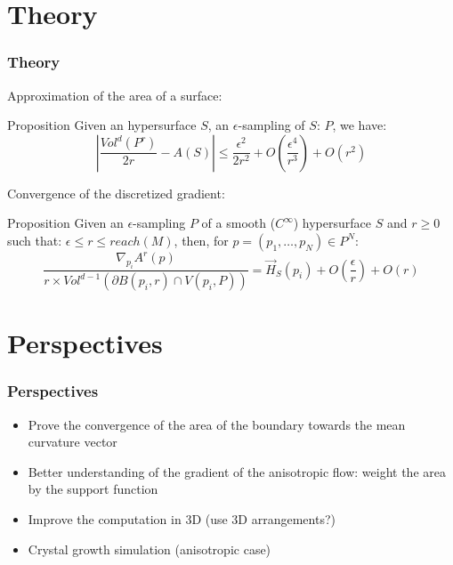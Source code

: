 \documentclass{beamer}
\newcommand{\meanv}[1]{\vec{H}_{#1}}
\begin{document}
\section{Theory}

\begin{frame}
    \frametitle{Theory}

    Approximation of the area of a surface:
    \begin{block}{Proposition}
        Given an hypersurface $ S $, an $\epsilon$-sampling of $ S $: $ P $, we
        have:
        $$
            | \frac{Vol^d(P^r)}{2r} - A(S) | \leq \frac{\epsilon^2}{2r^2} +
            O \left(\frac{\epsilon^4}{r^3} \right) + O(r^2)
        $$
    \end{block}

    Convergence of the discretized gradient:
    \begin{block}{Proposition}
        Given an $\epsilon$-sampling $ P $ of a smooth ($ C^{\infty} $) hypersurface
        $ S $ and $ r \ge 0 $ such that: $ \epsilon \leq r \leq reach(M) $, then,
        for $ p = (p_1, \ldots, p_N) \in P^N $:
        $$
            \frac{\nabla_{p_i} A^r(p)}{r \times Vol^{d-1}(\partial B(p_i,r) \cap V(p_i,P))}
            = \meanv{S}(p_i) + O \left(\frac{\epsilon}{r}\right) + O(r)
        $$
    \end{block}
\end{frame}

\section{Perspectives}

\begin{frame}
    \frametitle{Perspectives}

    \begin{itemize}
        \item Prove the convergence of the area of the boundary towards the mean
            curvature vector
        \item Better understanding of the gradient of the anisotropic flow:
            weight the area by the support function
        \item Improve the computation in 3D (use 3D arrangements?)
        \item Crystal growth simulation (anisotropic case)
    \end{itemize}
\end{frame}
\end{document}
